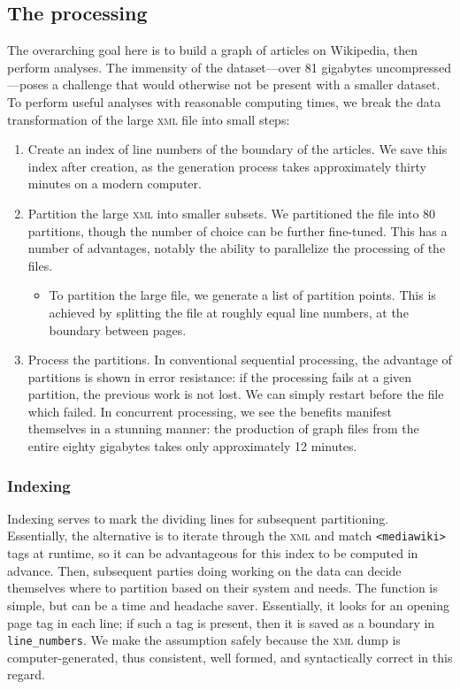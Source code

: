 \documentclass[fontsize=12pt]{article}
\begin{document}
\begin{multicols}{2}
    \subsection{The processing}
    The overarching goal here is to build a graph of articles on Wikipedia, then perform analyses. The immensity of the dataset---over 81 gigabytes uncompressed---poses a challenge that would otherwise not be present with a smaller dataset. To perform useful analyses with reasonable computing times, we break the data transformation of the large \textsc{xml} file into small steps: \begin{enumerate}
        \item Create an index of line numbers of the boundary of the articles. We save this index after creation, as the generation process takes approximately thirty minutes on a modern computer.
        \item Partition the large \textsc{xml} into smaller subsets. We partitioned the file into 80 partitions, though the number of choice can be further fine-tuned. This has a number of advantages, notably the ability to parallelize the processing of the files. \begin{itemize}
            \item To partition the large file, we generate a list of partition points. This is achieved by splitting the file at roughly equal line numbers, at the boundary between pages.
        \end{itemize}
        \item Process the partitions. In conventional sequential processing, the advantage of partitions is shown in error resistance: if the processing fails at a given partition, the previous work is not lost. We can simply restart before the file which failed. In concurrent processing, we see the benefits manifest themselves in a stunning manner: the production of graph files from the entire eighty gigabytes takes only approximately 12 minutes. 
    \end{enumerate}
    \subsubsection{Indexing}
    Indexing serves to mark the dividing lines for subsequent partitioning. Essentially, the alternative is to iterate through the \textsc{xml} and match \texttt{<mediawiki>} tags at runtime, so it can be advantageous for this index to be computed in advance. Then, subsequent parties doing working on the data can decide themselves where to partition based on their system and needs.
    The function is simple, but can be a time and headache saver. Essentially, it looks for an opening page tag in each line; if such a tag is present, then it is saved as a boundary in \texttt{line\_numbers}. We make the assumption safely because the \textsc{xml} dump is computer-generated, thus consistent, well formed, and syntactically correct in this regard.


\end{multicols}
\end{document}

